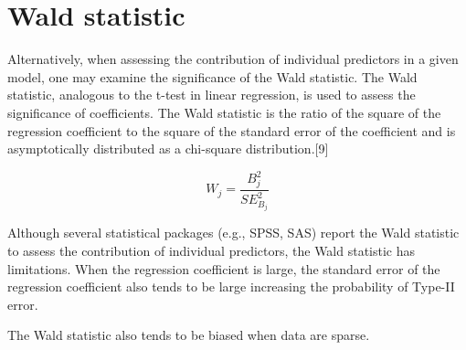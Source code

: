 \section{Wald statistic}
Alternatively, when assessing the contribution of individual predictors in a given model, one may examine the significance of the Wald statistic. The Wald statistic, analogous to the t-test in linear regression, is used to assess the significance of coefficients. The Wald statistic is the ratio of the square of the regression coefficient to the square of the standard error of the coefficient and is asymptotically distributed as a chi-square distribution.[9]

\[W_j = \frac{B^2_j} {SE^2_{B_j}}\]

Although several statistical packages (e.g., SPSS, SAS) report the Wald statistic to assess the contribution of individual predictors, the Wald statistic has limitations. When the regression coefficient is large, the standard error of the regression coefficient also tends to be large increasing the probability of Type-II error. 

The Wald statistic also tends to be biased when data are sparse.

